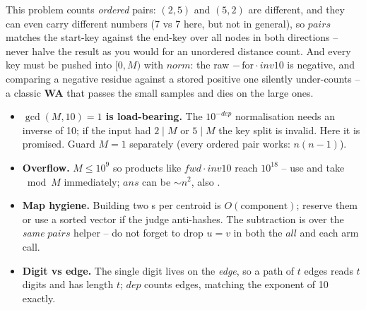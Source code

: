 \begin{warningbox}
This problem counts \emph{ordered} pairs: \((2,5)\) and \((5,2)\) are different, and
they can even carry different numbers (\(7\) vs \(7\) here, but not in general), so
\(\mathit{pairs}\) matches the start-key against the end-key over all nodes in both
directions -- never halve the result as you would for an unordered distance count.
And every key must be pushed into \([0,M)\) with \(\mathit{norm}\): the raw
\(-\,\text{for}\cdot\mathit{inv10}\) is negative, and comparing a negative residue
against a stored positive one silently under-counts -- a classic \textbf{WA} that
passes the small samples and dies on the large ones.
\end{warningbox}

\begin{hardeningbox}
\begin{itemize}[nosep,leftmargin=1.4em]
  \item \textbf{\(\gcd(M,10)=1\) is load-bearing.} The \(10^{-\mathit{dep}}\) normalisation
        needs an inverse of 10; if the input had \(2\mid M\) or \(5\mid M\) the key
        split is invalid. Here it is promised. Guard \(M=1\) separately (every
        ordered pair works: \(n(n-1)\)).
  \item \textbf{Overflow.} \(M\le 10^9\) so products like \(\mathit{fwd}\cdot
        \mathit{inv10}\) reach \(10^{18}\) -- use  and take \(\bmod M\)
        immediately; \(\mathit{ans}\) can be \(\sim n^2\), also .
  \item \textbf{Map hygiene.} Building two s per centroid is
        \(O(\text{component})\); reserve them or use a sorted vector if the judge
        anti-hashes. The subtraction is over the \emph{same} \(\mathit{pairs}\) helper
        -- do not forget to drop \(u=v\) in both the \(\mathit{all}\) and each arm call.
  \item \textbf{Digit vs edge.} The single digit lives on the \emph{edge}, so a path
        of \(t\) edges reads \(t\) digits and has length \(t\); \(\mathit{dep}\) counts edges,
        matching the exponent of 10 exactly.
\end{itemize}
\end{hardeningbox}

